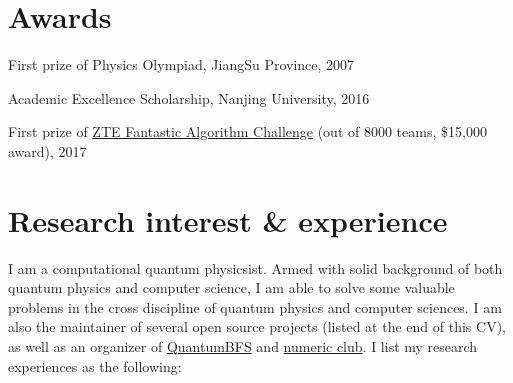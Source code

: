 \documentclass[letterpaper]{article}
\renewenvironment{itemize}{
  \begin{list}{}{
    \setlength{\leftmargin}{1.5em}
  }
}{
  \end{list}
}
\begin{document}
\section*{Awards}
\begin{itemize}
    \item First prize of Physics Olympiad, JiangSu Province, 2007
    \item Academic Excellence Scholarship, Nanjing University, 2016
    \item First prize of \href{http://www.iqiyi.com/w\_19rto3v4h1.html}{ZTE Fantastic Algorithm Challenge} (out of 8000 teams, \$15,000 award), 2017
\end{itemize}

\section*{Research interest \& experience}
I am a computational quantum physicsist. Armed with solid background of both quantum physics and computer science, I am able to solve some valuable problems in the cross discipline of quantum physics and computer sciences.
I am also the maintainer of several open source projects (listed at the end of this CV), as well as an organizer of \href{https://github.com/QuantumBFS/}{QuantumBFS} and \href{http://num.v2nobel.com}{numeric club}.
I list my research experiences as the following:
\end{document}
